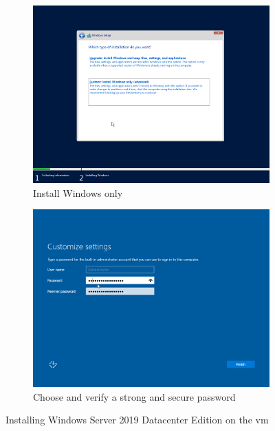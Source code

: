 \begin{figure}[!htb]\ContinuedFloat
	\begin{subfigure}{0.5\textwidth}
		\captionsetup{width=0.8\linewidth}
		\includegraphics[width=0.9\linewidth]{img/Methodologie/Migration8.png}
		\centering
		\caption{Install Windows only}
	\end{subfigure}
	\begin{subfigure}{0.5\textwidth}
		\captionsetup{width=0.8\linewidth}
		\includegraphics[width=0.9\linewidth]{img/Methodologie/Migration9.png} 
		\centering	
		\caption{Choose and verify a strong and secure password}
	\end{subfigure}
	\caption[Installing Windows Server]{Installing Windows Server 2019 Datacenter Edition on the \acrshort{vm}}
	\label{fig:WSInstallation}
\end{figure}
\clearpage
